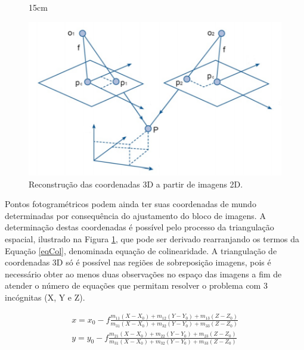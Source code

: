 \begin{figure}[!ht]{15cm}
  \caption{Reconstrução das coordenadas 3D a partir de imagens 2D.} \label{triang}
  \includegraphics[width=\hsize]{figuras/triangulacao.png}
\end{figure}

Pontos fotogramétricos podem ainda ter suas coordenadas de mundo determinadas por consequência do ajustamento do bloco de imagens. A determinação destas coordenadas é possível pelo processo da triangulação espacial, ilustrado na Figura \ref{triang}, que pode ser derivado rearranjando os termos da Equação \ref{eqCol}, denominada equação de colinearidade. A triangulação de coordenadas 3D só é possível nas regiões de sobreposição imagens, pois é necessário obter ao menos duas observações no espaço das imagens a fim de atender o número de equações que permitam resolver o problema com 3 incógnitas (X, Y e Z).

\begin{equation} \label{eqCol}
    \begin{matrix} 
	x = x_0 - f 
	\frac{m_{11}(X - X_0) + m_{12}(Y - Y_0) + m_{13}(Z - Z_0)}
	     {m_{31}(X - X_0) + m_{32}(Y - Y_0) + m_{33}(Z - Z_0)} \\
	y = y_0 - f 
	\frac{m_{21}(X - X_0) + m_{22}(Y - Y_0) + m_{23}(Z - Z_0)}
	     {m_{31}(X - X_0) + m_{32}(Y - Y_0) + m_{33}(Z - Z_0)}
	\end{matrix}
\end{equation}

